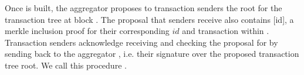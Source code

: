 \documentclass[../main.tex]{subfiles}
\begin{document}
Once  is built, the aggregator proposes to transaction senders the root  for the transaction tree at block . The proposal that senders receive also contains [id], a merkle inclusion proof for their corresponding $id$ and transaction within . Transaction senders acknowledge receiving and checking the proposal for  by sending back to the aggregator , i.e. their signature over the proposed transaction tree root. We call this procedure \signsend.
\end{document}
